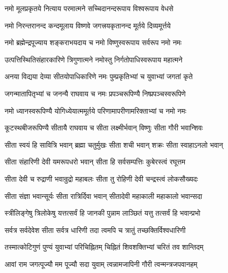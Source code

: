 

\addtocounter{shlokacount}{23}


\twolineshloka
{नमो मूलप्रकृतये नित्याय परमात्मने}
{सच्चिदानन्दरूपाय विश्वरूपाय वेधसे}%

\twolineshloka
{नमो निरन्तरानन्द कन्दमूलाय विष्णवे}
{जगत्त्रयकृतानन्द मूर्तये दिव्यमूर्त्तये}%

\twolineshloka
{नमो ब्रह्मेन्द्रपूज्याय शङ्कराभयदाय च}
{नमो विष्णुस्वरूपाय सर्वरूप नमो नमः}%

\twolineshloka
{उत्पत्तिस्थितिसंहारकारिणे त्रिगुणात्मने}
{नमोस्तु निर्गतोपाधिस्वरूपाय महात्मने}%

\twolineshloka
{अनया विद्यया देव्या सीतयोपाधिकारिणे}
{नमः पुम्प्रकृतिभ्यां च युवाभ्यां जगतां कृते}%

\twolineshloka
{जगन्मातापितृभ्यां च जनन्यै राघवाय च}
{नमः प्रपञ्चरूपिण्यै निष्प्रपञ्चस्वरूपिणे}%

\twolineshloka
{नमो ध्यानस्वरूपिण्यै योगिध्येयात्ममूर्तये}
{परिणामापरीणामरिक्ताभ्यां च नमो नमः}%

\twolineshloka
{कूटस्थबीजरूपिण्यै सीतायै राघवाय च}
{सीता लक्ष्मीर्भवान् विष्णुः सीता गौरी भवान्शिवः}%

\twolineshloka
{सीता स्वयं हि सावित्रि भवान् ब्रह्मा चतुर्मुखः}
{सीता शची भवान् शक्रः सीता स्वाहाऽनलो भवान्}%

\twolineshloka
{सीता संहारिणी देवी यमरूपधरो भवान्}
{सीता हि सर्वसम्पत्तिः कुबेरस्त्वं रघूत्तम}%

\twolineshloka
{सीता देवी च रुद्राणी भवान्रुद्रो महाबलः}
{सीता तु रोहिणी देवी चन्द्रस्त्वं लोकसौख्यदः}%

\twolineshloka
{सीता संज्ञा भवान्सूर्यः सीता रात्रिर्दिवा भवान्}
{सीतादेवी महाकाली महाकालो भवान्सदा}%

\twolineshloka
{स्त्रीलिङ्गेषु त्रिलोकेषु यत्तत्सर्वं हि जानकी}
{पुन्नाम लाञ्छितं यत्तु तत्सर्वं हि भवान्प्रभो}%

\twolineshloka
{सर्वत्र सर्वदेवेश सीता सर्वत्र धारिणी}
{तदा त्वमपि च त्रातुं तच्छक्तिर्विश्वधारिणी}%

\twolineshloka
{तस्मात्कोटिगुणं पुण्यं युवाभ्यां परिचिह्नितम्}
{चिह्नितं शिवशक्तिभ्यां चरितं तव शान्तिदम्}%

\twolineshloka
{आवां राम जगत्पूज्यौ मम पूज्यौ सदा युवाम्}
{त्वन्नामजापिनी गौरी त्वन्मन्त्रजपवानहम्}%

